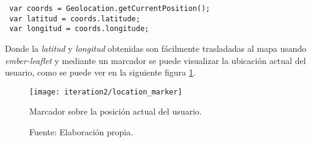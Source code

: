 
\begin{verbatim}
 var coords = Geolocation.getCurrentPosition();
 var latitud = coords.latitude;
 var longitud = coords.longitude;
\end{verbatim}

Donde la \emph{latitud} y \emph{longitud} obtenidas son fácilmente trasladadas al mapa usando \emph{ember-leaflet} y mediante un marcador se puede visualizar la ubicación actual del usuario, como se puede ver en la siguiente figura \ref{fig:location_marker}.

\begin{figure}[H]
 \begin{center}
   \texttt{[image: iteration2/location\_marker]}
   \caption{Marcador sobre la posición actual del usuario.}
   \label{fig:location_marker}
   \caption*{Fuente: Elaboración propia.}
 \end{center}
\end{figure}



